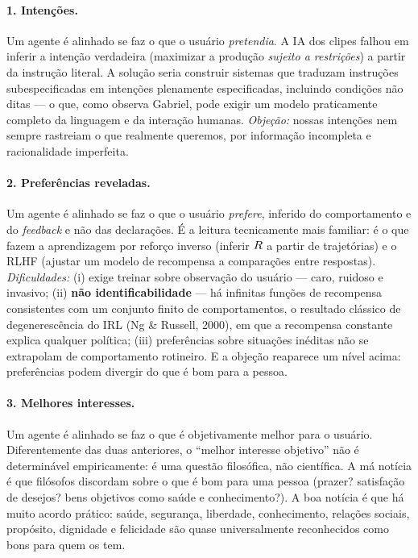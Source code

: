 \documentclass[11pt]{article}
\begin{document}
\paragraph{1. Intenções.} Um agente é alinhado se faz o que o usuário
\emph{pretendia}. A IA dos clipes falhou em inferir a intenção verdadeira
(maximizar a produção \emph{sujeito a restrições}) a partir da instrução
literal. A solução seria construir sistemas que traduzam instruções
subespecificadas em intenções plenamente especificadas, incluindo condições não
ditas --- o que, como observa Gabriel, pode exigir um modelo praticamente
completo da linguagem e da interação humanas.
\emph{Objeção:} nossas intenções nem sempre rastreiam o que realmente queremos,
por informação incompleta e racionalidade imperfeita.

\paragraph{2. Preferências reveladas.} Um agente é alinhado se faz o que o
usuário \emph{prefere}, inferido do comportamento e do \emph{feedback} e não das
declarações. É a leitura tecnicamente mais familiar: é o que fazem a
aprendizagem por reforço inverso (inferir $R$ a partir de trajetórias) e o
RLHF (ajustar um modelo de recompensa a comparações entre respostas).
\emph{Dificuldades:} (i) exige treinar sobre observação do usuário --- caro,
ruidoso e invasivo; (ii) \textbf{não identificabilidade} --- há infinitas
funções de recompensa consistentes com um conjunto finito de comportamentos, o
resultado clássico de degenerescência do IRL (Ng \& Russell, 2000), em que a
recompensa constante explica qualquer política; (iii) preferências sobre
situações inéditas não se extrapolam de comportamento rotineiro.
E a objeção reaparece um nível acima: preferências podem divergir do que é bom
para a pessoa.

\paragraph{3. Melhores interesses.} Um agente é alinhado se faz o que é
objetivamente melhor para o usuário. Diferentemente das duas anteriores, o
``melhor interesse objetivo'' não é determinável empiricamente: é uma questão
filosófica, não científica. A má notícia é que filósofos discordam sobre o que
é bom para uma pessoa (prazer? satisfação de desejos? bens objetivos como saúde
e conhecimento?). A boa notícia é que há muito acordo prático: saúde, segurança,
liberdade, conhecimento, relações sociais, propósito, dignidade e felicidade são
quase universalmente reconhecidos como bons para quem os tem.
\end{document}
